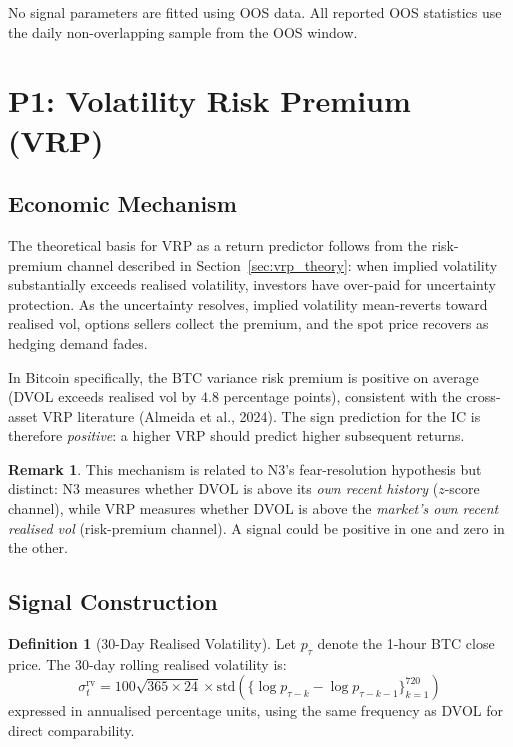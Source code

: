 \documentclass[12pt, a4paper]{article}
\theoremstyle{plain}
\theoremstyle{definition}
\newtheorem{definition}{Definition}[section]
\newtheorem{remark}{Remark}[section]
\begin{document}
No signal parameters are fitted using OOS data.  All reported OOS
statistics use the daily non-overlapping sample from the OOS window.

\section{P1: Volatility Risk Premium (VRP)}
\label{sec:p1}

\subsection{Economic Mechanism}

The theoretical basis for VRP as a return predictor follows from the
risk-premium channel described in Section~\ref{sec:vrp_theory}: when
implied volatility substantially exceeds realised volatility, investors
have over-paid for uncertainty protection.  As the uncertainty resolves,
implied volatility mean-reverts toward realised vol, options sellers
collect the premium, and the spot price recovers as hedging demand fades.

In Bitcoin specifically, the BTC variance risk premium is positive on
average (DVOL exceeds realised vol by $4.8$ percentage points), consistent
with the cross-asset VRP literature (Almeida et al., 2024).  The sign
prediction for the IC is therefore \emph{positive}: a higher VRP should
predict higher subsequent returns.

\begin{remark}
  This mechanism is related to N3's fear-resolution hypothesis but
  distinct: N3 measures whether DVOL is above its \emph{own recent
  history} ($z$-score channel), while VRP measures whether DVOL is
  above the \emph{market's own recent realised vol} (risk-premium
  channel).  A signal could be positive in one and zero in the other.
\end{remark}

\subsection{Signal Construction}

\begin{definition}[30-Day Realised Volatility]
  Let $p_\tau$ denote the 1-hour BTC close price.  The 30-day rolling
  realised volatility is:
  \begin{equation}
    \sigma^{\mathrm{rv}}_t = 100\sqrt{365 \times 24} \times
      \mathrm{std}\!\left(\{\log p_{\tau-k} - \log p_{\tau-k-1}\}_{k=1}^{720}\right)
  \end{equation}
  expressed in annualised percentage units, using the same frequency as
  DVOL for direct comparability.
\end{definition}
\end{document}
